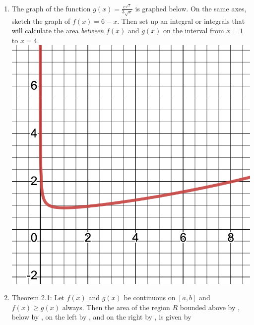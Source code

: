 \documentclass[11pt,fleqn]{article}
\begin{document}
\renewcommand{\headrulewidth}{0pt}
\newcommand{\blank}[1]{\rule{#1}{0.75pt}}
\newcommand{\bc}{\begin{center}}
\newcommand{\ec}{\end{center}}
\renewcommand{\d}{\displaystyle}

\vspace*{-0.7in}

\begin{center}
  \large
  \\
\end{center}

\begin{enumerate}
\item The graph of the function $\displaystyle g(x) = \frac{e^{\sqrt{x}}}{3\sqrt{x}}$ is graphed below. On the same axes, sketch the graph of $f(x)=6-x$. Then set up an integral or integrals that will calculate the area \emph{between} $f(x)$ and $g(x)$ on the interval from $x=1$ to $x=4.$\\

\includegraphics[scale=0.2]{pic-2-1.png}



\item Theorem 2.1: Let $f(x)$ and $g(x)$ be continuous on $[a,b]$ and $f(x) \geq g(x)$ always. Then the area of the region $R$ bounded above by \hspace{1.3cm}, below by \hspace{1.3cm}, on the left by \hspace{1.4cm}, and on the right by  \quad\quad\quad\hspace{1cm}, is given by\\


\end{enumerate}
\end{document}
